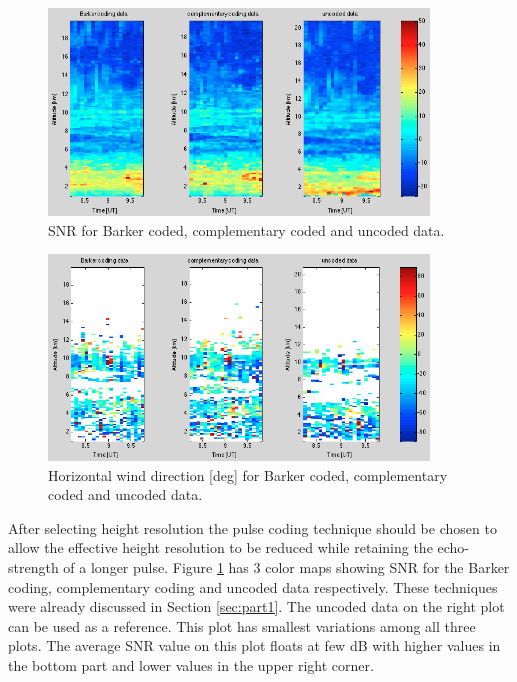\documentclass{article}
\begin{document}
\begin{figure}[t!]
\centering
\includegraphics[width=0.9\textwidth]{Figures/SNR_coding.png}
\caption{SNR for Barker coded, complementary coded and uncoded data.}
\label{fig:SNR_coding}
\end{figure}

\begin{figure}[t!]
\centering
\includegraphics[width=0.9\textwidth]{Figures/direction.png}
\caption{Horizontal wind direction [deg] for Barker coded, complementary coded and uncoded data.}
\label{fig:direction}
\end{figure}



After selecting height resolution the pulse coding technique should be chosen to allow the effective height resolution to be reduced while retaining the echo-strength of a longer pulse. Figure \ref{fig:SNR_coding} has 3 color maps showing SNR for the Barker coding, complementary coding and uncoded data respectively. These techniques were already discussed in Section \ref{sec:part1}. The uncoded data on the right plot can be used as a reference. This plot has smallest variations among all three plots. The average SNR value on this plot floats at few dB with higher values in the bottom part and lower values in the upper right corner.\\
\end{document}
